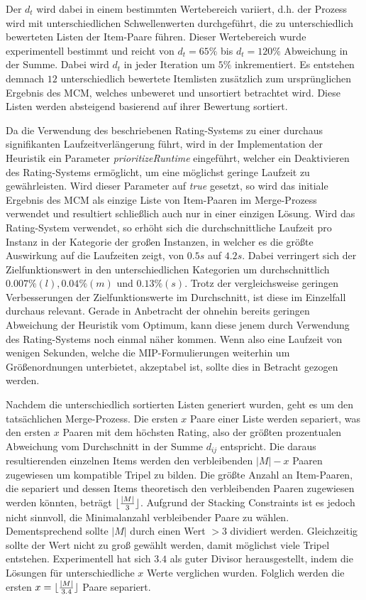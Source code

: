 Der  $d_t$ wird dabei in einem bestimmten Wertebereich variiert, d.h. der Prozess wird mit
unterschiedlichen Schwellenwerten durchgeführt, die zu unterschiedlich bewerteten Listen der Item-Paare führen.
Dieser Wertebereich wurde experimentell bestimmt und reicht von $d_t = 65 \%$ bis $d_t = 120 \%$ Abweichung in der Summe.
Dabei wird $d_t$ in jeder Iteration um $5 \%$ inkrementiert. Es entstehen demnach $12$ unterschiedlich bewertete Itemlisten zusätzlich zum ursprünglichen Ergebnis des \textsc{MCM}, welches unbeweret und unsortiert betrachtet wird. Diese Listen werden absteigend basierend auf ihrer Bewertung sortiert.

Da die Verwendung des beschriebenen Rating-Systems zu einer durchaus signifikanten Laufzeitverlängerung führt,
wird in der Implementation der Heuristik ein Parameter \textit{prioritizeRuntime} eingeführt, welcher ein Deaktivieren des
Rating-Systems ermöglicht, um eine möglichst geringe Laufzeit zu gewährleisten. Wird dieser Parameter auf \textit{true}
gesetzt, so wird das initiale Ergebnis des \textsc{MCM} als einzige Liste von Item-Paaren im Merge-Prozess verwendet und
resultiert schließlich auch nur in einer einzigen Lösung.
Wird das Rating-System verwendet, so erhöht sich die durchschnittliche Laufzeit pro Instanz in der Kategorie der großen
Instanzen, in welcher es die größte Auswirkung auf die Laufzeiten zeigt, von $0.5 s$ auf $4.2 s$. Dabei verringert
sich der Zielfunktionswert in den unterschiedlichen Kategorien um durchschnittlich $0.007 \% (l), 0.04 \% (m)$
und $0.13 \% (s)$. Trotz der vergleichsweise geringen Verbesserungen der Zielfunktionswerte im Durchschnitt,
ist diese im Einzelfall durchaus relevant. Gerade in Anbetracht der ohnehin bereits geringen Abweichung der Heuristik vom Optimum,
kann diese jenem durch Verwendung des Rating-Systems noch einmal näher kommen. Wenn also eine Laufzeit von wenigen Sekunden, welche
die MIP-Formulierungen weiterhin um Größenordnungen unterbietet, akzeptabel ist, sollte dies in Betracht gezogen werden.

Nachdem die unterschiedlich sortierten Listen generiert wurden, geht es um den tatsächlichen Merge-Prozess.
Die ersten $x$ Paare einer Liste werden separiert, was den ersten $x$ Paaren mit dem höchsten Rating, also der größten
prozentualen Abweichung vom Durchschnitt in der Summe $d_{ij}$ entspricht. Die daraus resultierenden einzelnen Items werden den verbleibenden
$|M| - x$ Paaren zugewiesen um kompatible Tripel zu bilden. Die größte Anzahl an Item-Paaren, die separiert und dessen Items theoretisch den verbleibenden Paaren zugewiesen werden könnten, beträgt $\lfloor\frac{|M|}{3}\rfloor$. Aufgrund der Stacking Constraints ist es jedoch nicht sinnvoll, die Minimalanzahl verbleibender Paare zu wählen. Dementsprechend sollte $|M|$ durch einen Wert $> 3$ dividiert werden. Gleichzeitig sollte der Wert nicht zu groß gewählt werden, damit möglichst viele Tripel entstehen. Experimentell hat sich $3.4$ als guter Divisor herausgestellt, indem die Lösungen für unterschiedliche $x$ Werte verglichen wurden. Folglich werden die ersten $x = \lfloor\frac{|M|}{3.4}\rfloor$ Paare separiert.

